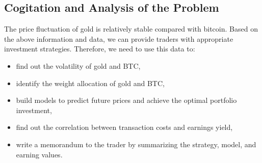\documentclass[12pt]{article}
\begin{document}
\subsection{Cogitation and Analysis of the Problem}
The price fluctuation of gold is relatively stable compared with bitcoin. Based on the above information and data, we can provide traders with appropriate investment strategies. Therefore, we need to use this data to:
\begin{itemize}
    \item find out the volatility of gold and BTC,
    \item identify the weight allocation of gold and BTC,
    \item build models to predict future prices and achieve the optimal portfolio investment,
    \item find out the correlation between transaction costs and earnings yield,
    \item write a memorandum to the trader by summarizing the strategy, model, and earning values.
\end{itemize}
\end{document}

